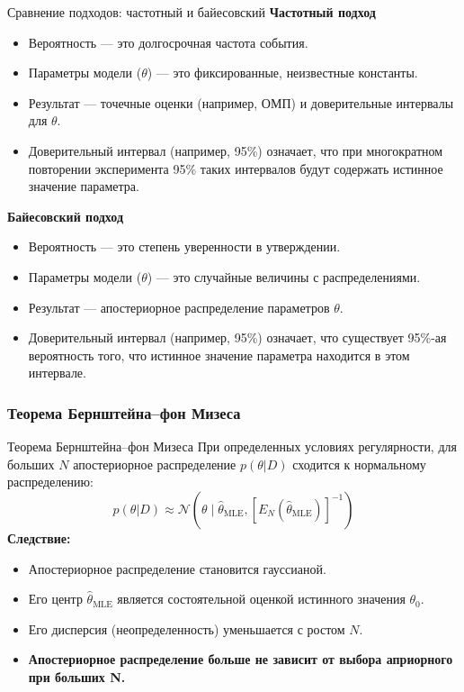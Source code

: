 \documentclass[notheorems, handout]{beamer}
\begin{document}
\begin{frame}{Сравнение подходов: частотный и байесовский}
  \textbf{Частотный подход}
  \begin{itemize}
    \item Вероятность --- это долгосрочная частота события.
    \item Параметры модели ($\theta$) --- это фиксированные,
      неизвестные константы.
    \item Результат --- точечные оценки (например, ОМП) и
      доверительные интервалы для $\theta$.
    \item Доверительный интервал (например, 95\%) означает, что при
      многократном повторении эксперимента 95\% таких интервалов
      будут содержать истинное значение параметра.
  \end{itemize}
  \textbf{Байесовский подход}
  \begin{itemize}
    \item Вероятность --- это степень уверенности в утверждении.
    \item Параметры модели ($\theta$) --- это случайные величины с
      распределениями.
    \item Результат --- апостериорное распределение параметров $\theta$.
    \item Доверительный интервал (например, 95\%) означает, что
      существует 95\%-ая вероятность того, что истинное значение
      параметра находится в этом интервале.
  \end{itemize}
\end{frame}
\begin{frame}
  \frametitle{Теорема Бернштейна--фон Мизеса}
  \begin{block}{Теорема Бернштейна--фон Мизеса}
    При определенных условиях регулярности, для больших $N$
    апостериорное распределение $p(\theta|D)$ сходится к нормальному
    распределению:
    $$ p(\theta|D) \approx \mathcal{N}(\theta \mid
    \hat{\theta}_{\text{MLE}}, [E_N(\hat{\theta}_{\text{MLE}})]^{-1}) $$
    \textbf{Следствие:}
    \begin{itemize}
      \item Апостериорное распределение становится гауссианой.
      \item Его центр $\hat{\theta}_{\text{MLE}}$ является
        состоятельной оценкой истинного значения $\theta_0$.
      \item Его дисперсия (неопределенность) уменьшается с ростом $N$.
      \item \textbf{Апостериорное распределение больше не зависит от
        выбора априорного при больших N.}
    \end{itemize}
  \end{block}

\end{frame}
\end{document}
